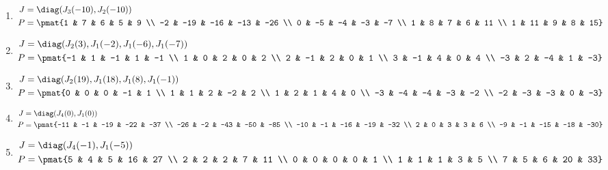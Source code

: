 \begin{enumerate}
\item

\begin{align*}
J &= \diag(J_{3}(-10), J_{2}(-10))\\
P &= \pmat{1 & 7 & 6 & 5 & 9 \\ -2 & -19 & -16 & -13 & -26 \\ 0 & -5 & -4 & -3 & -7 \\ 1 & 8 & 7 & 6 & 11 \\ 1 & 11 & 9 & 8 & 15}
\end{align*}

\item

\begin{align*}
J &= \diag(J_{2}(3), J_{1}(-2), J_{1}(-6), J_{1}(-7))\\
P &= \pmat{-1 & 1 & -1 & 1 & -1 \\ 1 & 0 & 2 & 0 & 2 \\ 2 & -1 & 2 & 0 & 1 \\ 3 & -1 & 4 & 0 & 4 \\ -3 & 2 & -4 & 1 & -3}
\end{align*}

\item

\begin{align*}
J &= \diag(J_{2}(19), J_{1}(18), J_{1}(8), J_{1}(-1))\\
P &= \pmat{0 & 0 & 0 & -1 & 1 \\ 1 & 1 & 2 & -2 & 2 \\ 1 & 2 & 1 & 4 & 0 \\ -3 & -4 & -4 & -3 & -2 \\ -2 & -3 & -3 & 0 & -3}
\end{align*}

\item

\begin{align*}
J &= \diag(J_{4}(0), J_{1}(0))\\
P &= \pmat{-11 & -1 & -19 & -22 & -37 \\ -26 & -2 & -43 & -50 & -85 \\ -10 & -1 & -16 & -19 & -32 \\ 2 & 0 & 3 & 3 & 6 \\ -9 & -1 & -15 & -18 & -30}
\end{align*}

\item

\begin{align*}
J &= \diag(J_{4}(-1), J_{1}(-5))\\
P &= \pmat{5 & 4 & 5 & 16 & 27 \\ 2 & 2 & 2 & 7 & 11 \\ 0 & 0 & 0 & 0 & 1 \\ 1 & 1 & 1 & 3 & 5 \\ 7 & 5 & 6 & 20 & 33}
\end{align*}


\end{enumerate}
